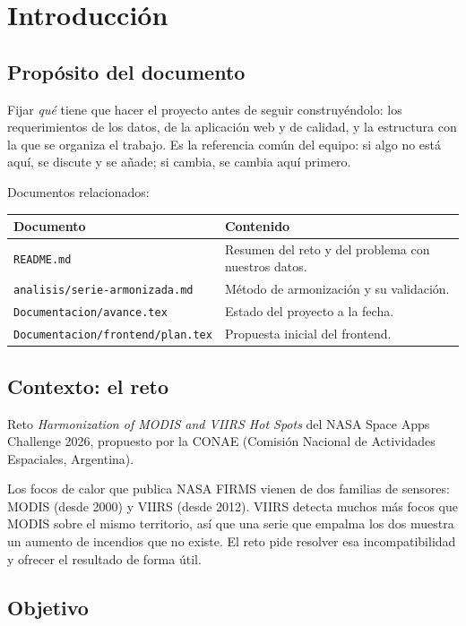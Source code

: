 \chapter{Introducción}\label{cap:introduccion}

\section{Propósito del documento}

Fijar \emph{qué} tiene que hacer el proyecto antes de seguir construyéndolo: los
requerimientos de los datos, de la aplicación web y de calidad, y la estructura con
la que se organiza el trabajo. Es la referencia común del equipo: si algo no está
aquí, se discute y se añade; si cambia, se cambia aquí primero.

Documentos relacionados:

\begin{tabularx}{\linewidth}{@{}lX@{}}
\toprule
Documento & Contenido \\
\midrule
\texttt{README.md} & Resumen del reto y del problema con nuestros datos. \\
\texttt{analisis/serie-armonizada.md} & Método de armonización y su validación. \\
\texttt{Documentacion/avance.tex} & Estado del proyecto a la fecha. \\
\texttt{Documentacion/frontend/plan.tex} & Propuesta inicial del frontend. \\
\bottomrule
\end{tabularx}

\section{Contexto: el reto}

Reto \emph{Harmonization of MODIS and VIIRS Hot Spots} del NASA Space Apps Challenge
2026, propuesto por la CONAE (Comisión Nacional de Actividades Espaciales, Argentina).

Los focos de calor que publica NASA FIRMS vienen de dos familias de sensores: MODIS
(desde 2000) y VIIRS (desde 2012). VIIRS detecta muchos más focos que MODIS sobre el
mismo territorio, así que una serie que empalma los dos muestra un aumento de incendios
que no existe. El reto pide resolver esa incompatibilidad y ofrecer el resultado de
forma útil.

\section{Objetivo}

